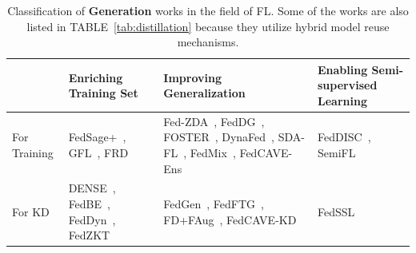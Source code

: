 \begin{table}[t]
  \centering
  \tiny
  \caption{Classification of \textbf{Generation} works in the field of FL. Some of the works are also listed in TABLE~\ref{tab:distillation} because they utilize hybrid model reuse mechanisms.}
  \label{tab:generation}

  \begin{tabular}{|l|p{2.1cm}|p{2.3cm}|p{1.45cm}|}
    \hline
    & Enriching Training Set & Improving Generalization  & Enabling Semi-supervised Learning  \\ \hline
   
    \multicolumn{1}{|l|}{For Training} & FedSage+~\cite{zhang2021subgraph}, GFL~\cite{cheng2023gfl}, \newline FRD~\cite{cha2019federated} & Fed-ZDA~\cite{hao2021towards}, FedDG~\cite{liu2021feddg}, FOSTER~\cite{yu2023turning}, DynaFed~\cite{pi2023dynafed}, SDA-FL~\cite{liz2022federated}, FedMix~\cite{yoon2021fedmix}, \newline FedCAVE-Ens~\cite{heinbaugh2023data} & FedDISC~\cite{yang2023exploring}, \newline SemiFL~\cite{diao2022semifl}  \\ \hline

    \multicolumn{1}{|l|}{For KD} & DENSE~\cite{zhang2022dense}, FedBE~\cite{chen2020fedbe}, \newline FedDyn~\cite{jin2023feddyn}, FedZKT~\cite{zhang2022fedzkt} & FedGen~\cite{zhu2021data}, FedFTG~\cite{zhang2022fine}, FD+FAug~\cite{jeong2018communication}, FedCAVE-KD~\cite{heinbaugh2023data} & FedSSL~\cite{fan2022private} \\ \hline
  \end{tabular}
  \vspace{-5mm}
\end{table}



